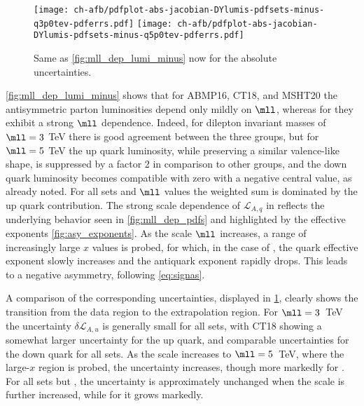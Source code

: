 \begin{figure}[!t]
 \centering
 \texttt{[image: ch-afb/pdfplot-abs-jacobian-DYlumis-pdfsets-minus-q3p0tev-pdferrs.pdf]}
 \texttt{[image: ch-afb/pdfplot-abs-jacobian-DYlumis-pdfsets-minus-q5p0tev-pdferrs.pdf]}
 \caption{Same as \cref{fig:mll_dep_lumi_minus} now for the absolute \pdf uncertainties.
    }    
 \label{fig:mll_dep_lumi_minus_pdferrs}
\end{figure}

\cref{fig:mll_dep_lumi_minus} shows that for ABMP16, CT18, and
MSHT20 the antisymmetric
parton luminosities depend only mildly on $\mll$, whereas for 
they exhibit a strong $\mll$ dependence.
%
Indeed, for dilepton invariant masses of $\mll=3$ TeV there is good
agreement between the three groups, but
for $\mll=5$ TeV the  up quark luminosity, while preserving a
similar valence-like shape, is suppressed
by a factor 2 in comparison  to other groups, and the down quark luminosity becomes compatible with zero with a negative
central value,  as already noted. 
%
For all \pdf sets and  $\mll$ values the weighted sum is dominated by the up quark contribution.
The strong scale dependence of $\mathcal{L}_{A,q}$ in 
reflects the underlying \pdf behavior seen in  \cref{fig:mll_dep_pdfs}
and highlighted by the effective exponents \cref{fig:asy_exponents}.
%
As the scale $\mll$ increases, a range of increasingly large $x$ values is probed,
for which, in the case of
, the quark effective exponent slowly increases and the
antiquark exponent rapidly drops.
%
This leads to a negative asymmetry, 
following  \cref{eq:signas}. 

A comparison of the corresponding \pdf uncertainties, displayed in
\cref{fig:mll_dep_lumi_minus_pdferrs}, clearly shows the transition
from the data region to the extrapolation region.
%
For
$\mll=3$~TeV the uncertainty $\delta \mathcal{L}_{A,u}$ is generally
small for all sets, with CT18
showing a somewhat larger uncertainty for the up quark, and comparable
uncertainties for the down quark for all \pdf sets.
%
As the scale  increases to $\mll=5$~TeV, where the large-$x$ region is
probed,  the uncertainty 
increases, though more markedly for .
%
For all \pdf sets but
, the
uncertainty is approximately unchanged when the scale is further increased,
while for  it grows markedly.


